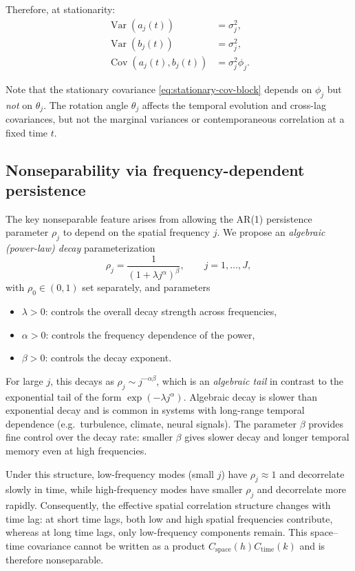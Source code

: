 \documentclass[answers,12pt,addpoints]{exam}
\begin{document}
Therefore, at stationarity:
\begin{align}
  \operatorname{Var}(a_j(t)) &= \sigma_j^2, \label{eq:var-aj}\\
  \operatorname{Var}(b_j(t)) &= \sigma_j^2, \label{eq:var-bj}\\
  \operatorname{Cov}(a_j(t), b_j(t)) &= \sigma_j^2 \phi_j. \label{eq:cov-aj-bj}
\end{align}

Note that the stationary covariance \eqref{eq:stationary-cov-block} depends on $\phi_j$ but \emph{not} on $\theta_j$. The rotation angle $\theta_j$ affects the temporal evolution and cross-lag covariances, but not the marginal variances or contemporaneous correlation at a fixed time $t$.

\subsection{Nonseparability via frequency-dependent persistence}

The key nonseparable feature arises from allowing the AR(1) persistence parameter $\rho_j$ to depend on the spatial frequency $j$. We propose an \emph{algebraic (power-law) decay} parameterization
\begin{equation}
  \rho_j
  =
  \frac{1}{(1 + \lambda j^\alpha)^\beta},
  \qquad j = 1,\dots,J,
  \label{eq:rhoj-algebraic}
\end{equation}
with $\rho_0 \in (0,1)$ set separately, and parameters
\begin{itemize}
  \item $\lambda > 0$: controls the overall decay strength across frequencies,
  \item $\alpha > 0$: controls the frequency dependence of the power,
  \item $\beta > 0$: controls the decay exponent.
\end{itemize}

For large $j$, this decays as $\rho_j \sim j^{-\alpha\beta}$, which is an \emph{algebraic tail} in contrast to the exponential tail of the form $\exp(-\lambda j^\alpha)$. Algebraic decay is slower than exponential decay and is common in systems with long-range temporal dependence (e.g.\ turbulence, climate, neural signals). The parameter $\beta$ provides fine control over the decay rate: smaller $\beta$ gives slower decay and longer temporal memory even at high frequencies.

Under this structure, low-frequency modes (small $j$) have $\rho_j \approx 1$ and decorrelate slowly in time, while high-frequency modes have smaller $\rho_j$ and decorrelate more rapidly. Consequently, the effective spatial correlation structure changes with time lag: at short time lags, both low and high spatial frequencies contribute, whereas at long time lags, only low-frequency components remain. This space--time covariance cannot be written as a product $C_{\text{space}}(h) C_{\text{time}}(k)$ and is therefore nonseparable.
\end{document}
